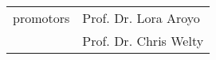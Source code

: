 \thispagestyle{empty}

\begin{addmargin}[-3cm]{1cm}

\begin{flushleft}
\begin{tabular}{l l}
promotors & Prof. Dr. Lora Aroyo\\
& Prof. Dr. Chris Welty\\
\end{tabular}
\end{flushleft}

\end{addmargin}